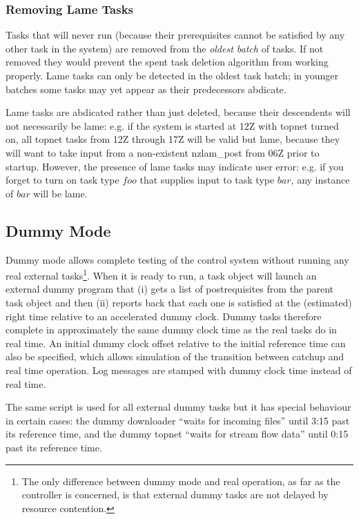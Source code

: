 \documentclass[11pt,a4paper]{article}
\begin{document}
\subsubsection{Removing Lame Tasks} 

Tasks that will never run (because their prerequisites cannot be
satisfied by any other task in the system) are removed from the {\em
oldest batch} of tasks.  If not removed they would prevent the spent
task deletion algorithm from working properly. Lame tasks can only be
detected in the oldest task batch; in younger batches some tasks may yet
appear as their predecessors abdicate.

Lame tasks are abdicated rather than just deleted, because their
descendents will not necessarily be lame: e.g. if the system is started
at 12Z with topnet turned on, all topnet tasks from 12Z through 17Z will
be valid but lame, because they will want to take input from a
non-existent nzlam\_post from 06Z prior to startup. However, the
presence of lame tasks may indicate user error: e.g. if you forget
to turn on task type $foo$ that supplies input to task type $bar$,
any instance of $bar$ will be lame.


\subsection{Dummy Mode}

Dummy mode allows complete testing of the control system without running
any real external tasks\footnote{The only difference between dummy mode
and real operation, as far as the controller is concerned, is that
external dummy tasks are not delayed by resource contention.}. When it
is ready to run, a task object will launch an external dummy program
that (i) gets a list of postrequisites from the parent task object and
then (ii) reports back that each one is satisfied at the (estimated)
right time relative to an accelerated dummy clock. Dummy tasks therefore
complete in approximately the same dummy clock time as the real tasks do
in real time. An initial dummy clock offset relative to the initial
reference time can also be specified, which allows simulation of the
transition between catchup and real time operation. Log messages are
stamped with dummy clock time instead of real time.

The same script is used for all external dummy tasks but it has special
behaviour in certain cases: the dummy downloader ``waits for incoming
files'' until 3:15 past its reference time, and the dummy topnet ``waits
for stream flow data'' until 0:15 past its reference time.
\end{document}
